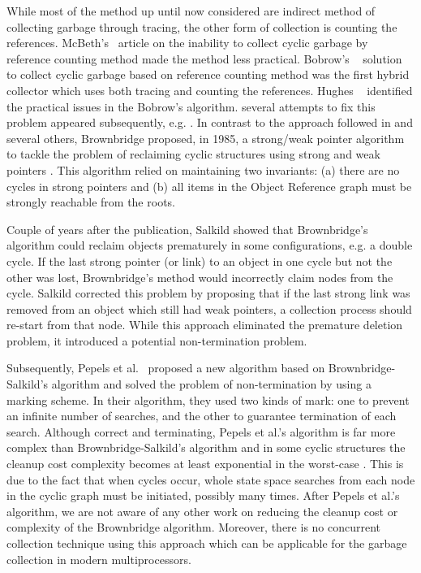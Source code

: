 While most of the method up until now considered are  indirect method of collecting garbage through tracing, the other form of collection is counting the references. McBeth's~\cite{McBeth1963} article on the inability to collect cyclic garbage  by 
reference counting method made the method less practical. Bobrow's ~\cite{Bobrow1980} solution to collect cyclic garbage based on reference counting method was the first hybrid collector which uses both tracing and
counting the references. Hughes ~\cite{hugh83,hugh87} identified the practical issues in the Bobrow's algorithm.
several attempts to fix this problem appeared subsequently, e.g. \cite{Friedman1979,Bobrow1980,Lins2008}. 
In contrast to the approach followed in \cite{Friedman1979,Bobrow1980,Lins2008} and several others,
Brownbridge \cite{Brownbridge1985} proposed, in 1985, a strong/weak pointer algorithm to tackle the problem of reclaiming cyclic  structures using strong and weak pointers \cite{Jones1996}. 
This algorithm relied on maintaining two invariants: (a) there are no cycles in strong pointers and (b) all items in the Object Reference graph must be strongly reachable from the roots.

Couple of years after the publication, Salkild \cite{Salkild1987} showed that Brownbridge's algorithm
\cite{Brownbridge1985} could reclaim objects prematurely in some
configurations, e.g. a double cycle. If the last strong pointer (or link) to
an object in one cycle but not the other was lost, Brownbridge's
method would incorrectly claim nodes from the cycle.
Salkild \cite{Salkild1987} corrected this problem by proposing
that if the last strong link was removed from an object which still
had weak pointers, a collection process should re-start from that node.
While this approach eliminated the premature deletion problem, it introduced a
potential non-termination problem.

Subsequently, Pepels et al.~\cite{Pepels1988} proposed a new algorithm based on
Brownbridge-Salkild's algorithm and solved the problem of non-termination by
using a marking scheme. In their algorithm, they used two kinds of mark: one to
prevent an infinite number of searches, and the other to guarantee termination
of each search. Although correct and terminating, Pepels et al.'s algorithm is far more
complex than Brownbridge-Salkild's algorithm and in some cyclic structures the
cleanup cost complexity becomes at least
exponential in the worst-case \cite{Jones1996}. This is due to the fact that when
cycles occur, whole state space searches from
each node in the cyclic graph must be initiated, possibly many times. After Pepels et al.'s algorithm, we are not aware
of any other work on reducing the cleanup cost or complexity of the Brownbridge
algorithm. Moreover, there is no concurrent collection technique using this approach which can be applicable for the garbage collection in modern multiprocessors.

